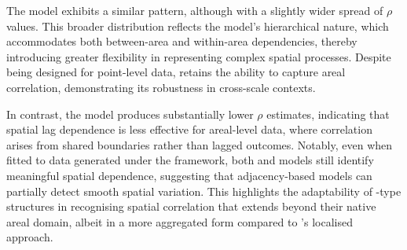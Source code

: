 \documentclass[
  letterpaper,
  DIV=11,
  numbers=noendperiod]{scrartcl}
\begin{document}
The  model exhibits a similar pattern, although with a
slightly wider spread of \(\rho\) values. This broader distribution
reflects the model's hierarchical nature, which accommodates both
between-area and within-area dependencies, thereby introducing greater
flexibility in representing complex spatial processes. Despite being
designed for point-level data,  retains the ability to
capture areal correlation, demonstrating its robustness in cross-scale
contexts.

In contrast, the  model produces substantially lower \(\rho\)
estimates, indicating that spatial lag dependence is less effective for
areal-level data, where correlation arises from shared boundaries rather
than lagged outcomes. Notably, even when fitted to data generated under
the  framework, both  and  models still
identify meaningful spatial dependence, suggesting that adjacency-based
models can partially detect smooth spatial variation. This highlights
the adaptability of -type structures in recognising spatial
correlation that extends beyond their native areal domain, albeit in a
more aggregated form compared to 's localised approach.
\end{document}
